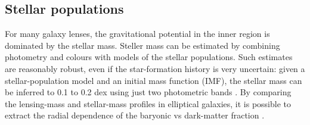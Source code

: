 \documentclass[galley,usenatbib]{mn2e}
\newcommand{\Glass}{{\sc Glass}}
\newcommand{\secref}[1] {\S\ref{#1}}
\renewcommand{\vec}[1]{\ensuremath{\boldsymbol{#1}}}
\begin{document}


\subsection{Stellar populations} 

For many galaxy lenses, the gravitational potential in the inner
region is dominated by the stellar mass.  Steller mass can be
estimated by combining photometry and colours with models of the
stellar populations.  Such estimates are reasonably robust, even if
the star-formation history is very uncertain: given a
stellar-population model \citep[such as][]{2003MNRAS.344.1000B} and an
initial mass function (IMF), the stellar mass can be inferred to 0.1
to 0.2 dex using just two photometric bands \citep[see e.g., Figure~1
  in][]{2008MNRAS.383..857F}.  By comparing the lensing-mass and
stellar-mass profiles in elliptical galaxies, it is possible to
extract the radial dependence of the baryonic vs dark-matter fraction
\citep{2005ApJ...623L...5F,2008MNRAS.383..857F,2011ApJ...740...97L}.
\end{document}
